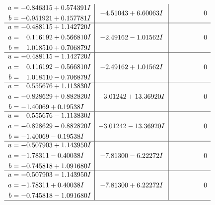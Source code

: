 \documentclass[1p]{elsarticle_modified}
\theoremstyle{definition}
\begin{document}
$$\begin{array}{c|c|c}
\begin{aligned}
a &= -0.846315 + 0.574391 I \\
b &= -0.951921 + 0.157781 I\end{aligned}
 & -4.51043 + 6.60063 I & \phantom{-0.000000 } 0 \\ \hline\begin{aligned}
u &= -0.488115 + 1.142720 I \\
a &= \phantom{-}0.116192 + 0.566810 I \\
b &= \phantom{-}1.018510 + 0.706879 I\end{aligned}
 & -2.49162 - 1.01562 I & \phantom{-0.000000 } 0 \\ \hline\begin{aligned}
u &= -0.488115 - 1.142720 I \\
a &= \phantom{-}0.116192 - 0.566810 I \\
b &= \phantom{-}1.018510 - 0.706879 I\end{aligned}
 & -2.49162 + 1.01562 I & \phantom{-0.000000 } 0 \\ \hline\begin{aligned}
u &= \phantom{-}0.555676 + 1.113830 I \\
a &= -0.828629 + 0.882820 I \\
b &= -1.40069 + 0.19538 I\end{aligned}
 & -3.01242 + 13.36920 I & \phantom{-0.000000 } 0 \\ \hline\begin{aligned}
u &= \phantom{-}0.555676 - 1.113830 I \\
a &= -0.828629 - 0.882820 I \\
b &= -1.40069 - 0.19538 I\end{aligned}
 & -3.01242 - 13.36920 I & \phantom{-0.000000 } 0 \\ \hline\begin{aligned}
u &= -0.507903 + 1.143950 I \\
a &= -1.78311 - 0.40038 I \\
b &= -0.745818 + 1.091680 I\end{aligned}
 & -7.81300 - 6.22272 I & \phantom{-0.000000 } 0 \\ \hline\begin{aligned}
u &= -0.507903 - 1.143950 I \\
a &= -1.78311 + 0.40038 I \\
b &= -0.745818 - 1.091680 I\end{aligned}
 & -7.81300 + 6.22272 I & \phantom{-0.000000 } 0\\
 \hline 
 \end{array}$$\newpage$$\begin{array}{c|c|c}  

\end{array}$$
\end{document}

